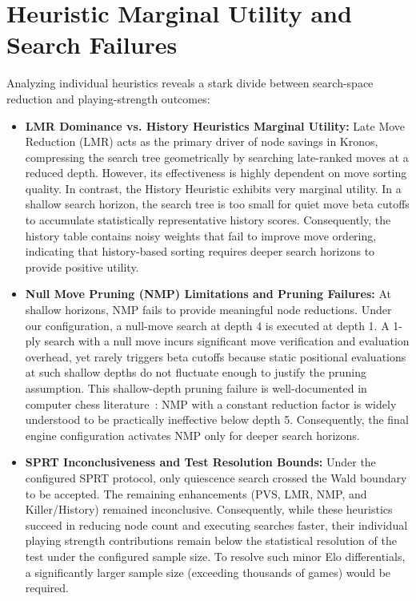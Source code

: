 \section{Heuristic Marginal Utility and Search Failures}
Analyzing individual heuristics reveals a stark divide between search-space reduction and playing-strength outcomes:
\begin{itemize}
    \item \textbf{LMR Dominance vs. History Heuristics Marginal Utility:} Late Move Reduction (LMR) acts as the primary driver of node savings in Kronos, compressing the search tree geometrically by searching late-ranked moves at a reduced depth. However, its effectiveness is highly dependent on move sorting quality. In contrast, the History Heuristic exhibits very marginal utility. In a shallow search horizon, the search tree is too small for quiet move beta cutoffs to accumulate statistically representative history scores. Consequently, the history table contains noisy weights that fail to improve move ordering, indicating that history-based sorting requires deeper search horizons to provide positive utility.
    \item \textbf{Null Move Pruning (NMP) Limitations and Pruning Failures:} At shallow horizons, NMP fails to provide meaningful node reductions. Under our configuration, a null-move search at depth 4 is executed at depth 1. A 1-ply search with a null move incurs significant move verification and evaluation overhead, yet rarely triggers beta cutoffs because static positional evaluations at such shallow depths do not fluctuate enough to justify the pruning assumption. This shallow-depth pruning failure is well-documented in computer chess literature~\cite{donninger1993null}: NMP with a constant reduction factor is widely understood to be practically ineffective below depth 5. Consequently, the final engine configuration activates NMP only for deeper search horizons.
    \item \textbf{SPRT Inconclusiveness and Test Resolution Bounds:} Under the configured SPRT protocol, only quiescence search crossed the Wald boundary to be accepted. The remaining enhancements (PVS, LMR, NMP, and Killer/History) remained inconclusive. Consequently, while these heuristics succeed in reducing node count and executing searches faster, their individual playing strength contributions remain below the statistical resolution of the test under the configured sample size. To resolve such minor Elo differentials, a significantly larger sample size (exceeding thousands of games) would be required.

\end{itemize}

